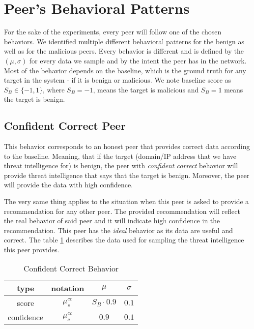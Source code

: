 \section{Peer's Behavioral Patterns}
\label{sec:peers-behavioral-patterns}
For the sake of the experiments, every peer will follow one of the chosen behaviors.
We identified multiple different behavioral patterns for the benign as well as for the malicious peers.
Every behavior is different and is defined by the $(\mu, \sigma)$ for every data we sample and by the intent the peer has in the network.
Most of the behavior depends on the baseline, which is the ground truth for any target in the system - if it is benign or malicious.
We note baseline score as $S_{B} \in \{-1, 1\}$, where $S_{B} = -1$, means the target is malicious and $S_{B} = 1$ means the target is benign.


\subsection{Confident Correct Peer}
\label{subsubsec:confident-correct-peer}
This behavior corresponds to an honest peer that provides correct data according to the baseline. 
Meaning, that if the target (domain/IP address that we have threat intelligence for) is benign, the peer with \textit{confident correct} behavior will provide threat intelligence that says that the target is benign. 
Moreover, the peer will provide the data with high confidence.

The very same thing applies to the situation when this peer is asked to provide a recommendation for any other peer. 
The provided recommendation will reflect the real behavior of said peer and it will indicate high confidence in the recommendation.
This peer has the \textit{ideal} behavior as its data are useful and correct.
The table \ref{tab:confident-correct} describes the data used for sampling the threat intelligence this peer provides.

\begin{table}[!ht]
    \centering
    \begin{tabular}{c|c|c|c}
        type & notation & $\mu$ & $\sigma$ \\
        \hline
        score & $\mu^{cc}_{s}$ & $S_{B} \cdot 0.9$ & $0.1$ \\
        confidence & $\mu^{cc}_{c}$ &  $0.9$ & $0.1$ \\
    \end{tabular}
    \caption{Confident Correct Behavior}
    \label{tab:confident-correct}
\end{table}

